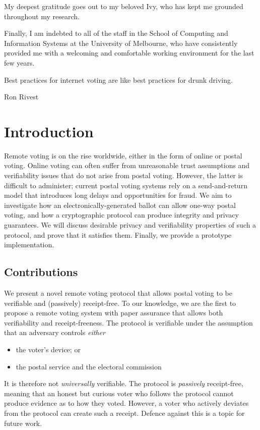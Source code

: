 \documentclass[12pt,a4paper]{article}
\theoremstyle{definition}
\begin{document}
My deepest gratitude goes out to my beloved Ivy, who has kept me grounded throughout my research.

Finally, I am indebted to all of the staff in the School of Computing and Information Systems at the University of Melbourne, who have consistently provided me with a welcoming and comfortable working environment for the last few years.
\newpage
\epigraph{Best practices for internet voting are like best practices for drunk driving.}{Ron Rivest}
\section{Introduction}
Remote voting is on the rise worldwide, either in the form of online or postal voting. Online voting can often suffer from unreasonable trust assumptions and verifiability issues that do not arise from postal voting. However, the latter is difficult to administer; current postal voting systems rely on a send-and-return model that introduces long delays and opportunities for fraud. We aim to investigate how an electronically-generated ballot can allow one-way postal voting, and how a cryptographic protocol can produce integrity and privacy guarantees. We will discuss desirable privacy and verifiability properties of such a protocol, and prove that it satisfies them. Finally, we provide a prototype implementation.

\subsection{Contributions}
We present a novel remote voting protocol that allows postal voting to be verifiable and (passively) receipt-free. To our knowledge, we are the first to propose a remote voting system with paper assurance that allows both verifiability and receipt-freeness. The protocol is verifiable under the assumption that an adversary controls \textit{either}
\begin{itemize}
    \item the voter's device; or
    \item the postal service and the electoral commission
\end{itemize}
It is therefore not \textit{universally} verifiable. The protocol is \textit{passively} receipt-free, meaning that an honest but curious voter who follows the protocol cannot produce evidence as to how they voted. However, a voter who actively deviates from the protocol can create such a receipt. Defence against this is a topic for future work.
\end{document}
